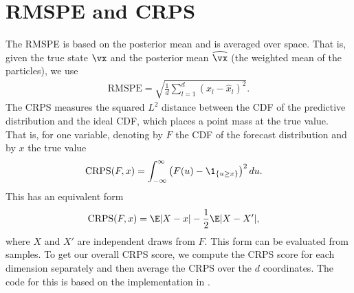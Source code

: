 \documentclass[12pt]{article}
\begin{document}
\section{RMSPE and CRPS}\label{sec:metrics}
The RMSPE is based on the posterior mean and is averaged over space. That is,
given the true state $\vx$ and the posterior mean $\widehat\vx$ (the weighted
mean of the particles), we use
\begin{align}
    \text{RMSPE} = \sqrt{\frac 1 d \sum_{l=1}^d (x_l - \widehat x_l)^2}.
\end{align}
The CRPS measures the squared $L^2$ distance between the CDF of the predictive
distribution and the ideal CDF, which places a point mass at the true value.
That is, for one variable, denoting by $F$ the CDF of the forecast
distribution and by $x$ the true value
\begin{align}
    \text{CRPS}(F, x) &= \int_{-\infty}^{\infty} \left(F(u) - \1_{\{u \geq x\}}\right)^2 du.
\end{align}
This has an equivalent form \cite{gneiting2007}
\begin{align}
    \text{CRPS}(F, x) &= \E|X - x| - \frac 1 2 \E|X - X'|,
\end{align}
where $X$ and $X'$ are independent draws from $F$. This form can be evaluated
from samples. To get our overall CRPS score, we compute the CRPS score for each
dimension separately and then average the CRPS over the $d$ coordinates. The
code for this is based on the implementation in \cite{katzfuss2020}.
\end{document}

